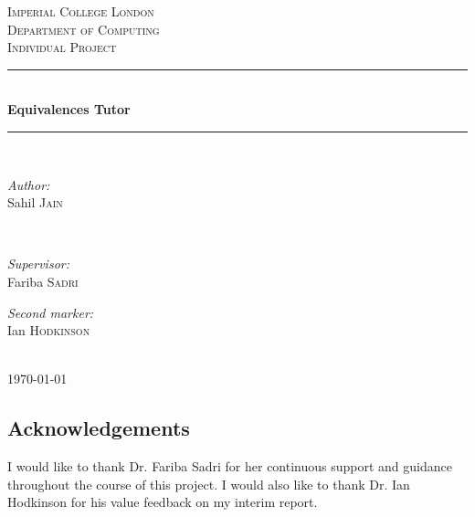 \documentclass{report}
\begin{document}

\begin{titlepage}
\newcommand{\HRule}{\rule{\linewidth}{0.5mm}}
\center
\textsc{\LARGE Imperial College London} \\[0.5cm]
\textsc{\Large Department of Computing} \\[0.5cm]
\textsc{\large Individual Project} \\[1.5cm]
\HRule \\[0.3cm]
{\huge \bfseries Equivalences Tutor} \\[0.3cm]
\HRule \\[1.5cm]

\begin{minipage}{0.4\textwidth}
\begin{flushleft} \large \emph{Author:} \\
Sahil \textsc{Jain}
\end{flushleft}
\end{minipage}~
\begin{minipage}{0.4\textwidth}
\begin{flushright} \large \emph{Supervisor:} \\
Fariba \textsc{Sadri}
\end{flushright}
\begin{flushright} \large \emph{Second marker:} \\
Ian \textsc{Hodkinson}
\end{flushright}
\end{minipage}\\[4cm]
{\large \today}\\[3cm]
\vfill
\end{titlepage}


\begin{abstract}
\end{abstract}



\subsection*{\centering Acknowledgements}
I would like to thank Dr. Fariba Sadri for her continuous support and guidance
throughout the course of this project. I would also like to thank Dr. Ian
Hodkinson for his value feedback on my interim report.
\end{document}
